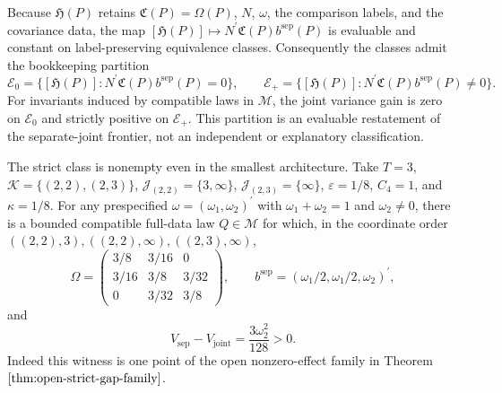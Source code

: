 Because \(\mathfrak H(P)\) retains \(\mathfrak C(P)=\Omega(P)\), \(N\), \(\omega\), the comparison labels, and the covariance data, the map \([\mathfrak H(P)]\mapsto N^{\prime}\mathfrak C(P)b^{\mathrm{sep}}(P)\) is evaluable and constant on label-preserving equivalence classes. Consequently the classes admit the bookkeeping partition
\[
 \mathscr E_0=\{[\mathfrak H(P)]:N^{\prime}\mathfrak C(P)b^{\mathrm{sep}}(P)=0\},
 \qquad
 \mathscr E_+=\{[\mathfrak H(P)]:N^{\prime}\mathfrak C(P)b^{\mathrm{sep}}(P)\ne0\}.
\]
For invariants induced by compatible laws in \(\mathcal M\), the joint variance gain is zero on \(\mathscr E_0\) and strictly positive on \(\mathscr E_+\). This partition is an evaluable restatement of the separate-joint frontier, not an independent or explanatory classification.

The strict class is nonempty even in the smallest architecture. Take \(T=3\), \(\mathcal K=\{(2,2),(2,3)\}\), \(\mathcal J_{(2,2)}=\{3,\infty\}\), \(\mathcal J_{(2,3)}=\{\infty\}\), \(\varepsilon=1/8\), \(C_4=1\), and \(\kappa=1/8\). For any prespecified \(\omega=(\omega_1,\omega_2)^{\prime}\) with \(\omega_1+\omega_2=1\) and \(\omega_2\ne0\), there is a bounded compatible full-data law \(Q\in\mathcal M\) for which, in the coordinate order \(((2,2),3),((2,2),\infty),((2,3),\infty)\),
\[
 \Omega=
 \begin{pmatrix}
 3/8&3/16&0\\
 3/16&3/8&3/32\\
 0&3/32&3/8
 \end{pmatrix},
 \qquad
 b^{\mathrm{sep}}=(\omega_1/2,\omega_1/2,\omega_2)^{\prime},
\]
and
\[
 V_{\mathrm{sep}}-V_{\mathrm{joint}}=\frac{3\omega_2^2}{128}>0.
\]
Indeed this witness is one point of the open nonzero-effect family in Theorem \(\ref{thm:open-strict-gap-family}\).